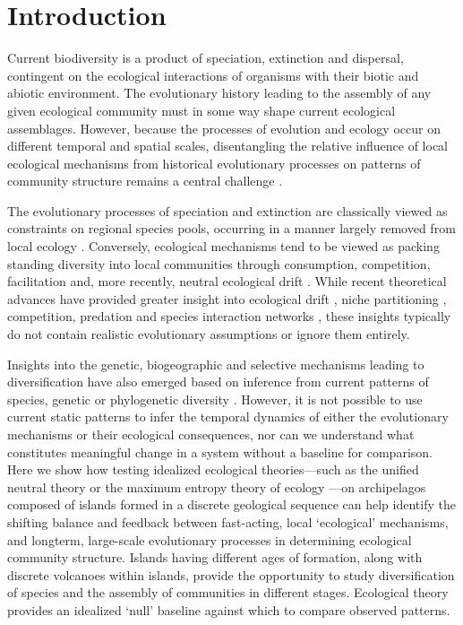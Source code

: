 \clearpage

\section{Introduction}

Current biodiversity is a product of speciation, extinction and
dispersal, contingent on the ecological interactions of organisms with
their biotic and abiotic environment. The evolutionary history leading
to the assembly of any given ecological community must in some way
shape current ecological assemblages. However, because the processes
of evolution and ecology occur on different temporal and spatial
scales, disentangling the relative influence of local ecological
mechanisms from historical evolutionary processes on patterns of
community structure remains a central challenge \citep{ricklefs2004}.

The evolutionary processes of speciation and extinction are
classically viewed as constraints on regional species pools, occurring
in a manner largely removed from local ecology \citep{hubbell2001,
  cavenderbares2009, wiens2011}. Conversely, ecological mechanisms
tend to be viewed as packing standing diversity into local communities
through consumption, competition, facilitation and, more recently,
neutral ecological drift \citep{hubbell2001, tilman2004,
  bascompte2007, borer2014}. While recent theoretical advances have
provided greater insight into ecological drift \citep{hubbell2001,
  rosindell2011ecolLett}, niche partitioning \citep{tilman2004},
competition, predation \citep{borer2014} and species interaction
networks \citep{williams2000, brose2006}, these insights typically do
not contain realistic evolutionary assumptions
\citep{ricklefs2006neutral} or ignore them entirely.

Insights into the genetic, biogeographic and selective mechanisms
leading to diversification have also emerged based on inference from
current patterns of species, genetic or phylogenetic diversity
\citep[e.g.][]{wiens2011, jetz2012}. However, it is not possible to
use current static patterns to infer the temporal dynamics of either
the evolutionary mechanisms or their ecological consequences, nor can
we understand what constitutes meaningful change in a system without a
baseline for comparison. Here we show how testing idealized ecological
theories---such as the unified neutral theory \citep{hubbell2001} or
the maximum entropy theory of ecology \citep{harte2011}---on
archipelagos composed of islands formed in a discrete geological
sequence can help identify the shifting balance and feedback between
fast-acting, local ‘ecological’ mechanisms, and longterm, large-scale
evolutionary processes in determining ecological community
structure. Islands having different ages of formation, along with
discrete volcanoes within islands, provide the opportunity to study
diversification of species and the assembly of communities in
different stages. Ecological theory provides an idealized ‘null’
baseline against which to compare observed patterns.


